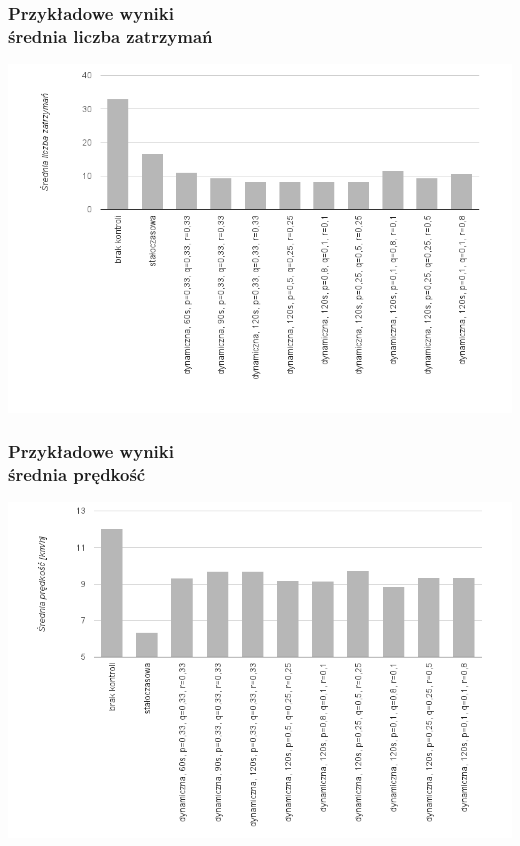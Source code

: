 \documentclass[17pt]{beamer}
\begin{document}
\begin{frame}[shrink=5]
  \frametitle{\vspace{10px}Przykładowe wyniki\\\small{średnia liczba zatrzymań}}
  \includegraphics[width=1.0\textwidth]{wyniki_1.png}
\end{frame}

\begin{frame}[shrink=5]
  \frametitle{\vspace{10px}Przykładowe wyniki\\\small{średnia prędkość}}
  \includegraphics[width=1.0\textwidth]{wyniki_2.png}
\end{frame}
\end{document}
